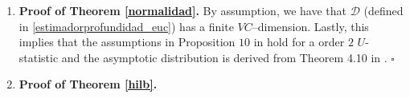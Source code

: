 \documentclass[a4paper]{article}
\newcommand*{\QEDB}{\hfill\ensuremath{\square}}%
\numberwithin{equation}{section}
\begin{document}
\begin{enumerate}[label=(\Alph*)]
\item \textbf{Proof of Theorem \ref{normalidad}.}
By assumption, we have that $\mathcal D$ (defined in \ref{estimadorprofundidad_euc})  has a finite $VC$--dimension.  Lastly, this implies that the assumptions in Proposition $10$ in  \cite{gine1996} hold for a order $2$ $U$-statistic and the asymptotic distribution is derived from  Theorem 4.10 in  \cite{arcones1993}.
\QEDB






















\item \textbf{Proof of Theorem \ref{hilb}.}


\end{enumerate}
\end{document}
